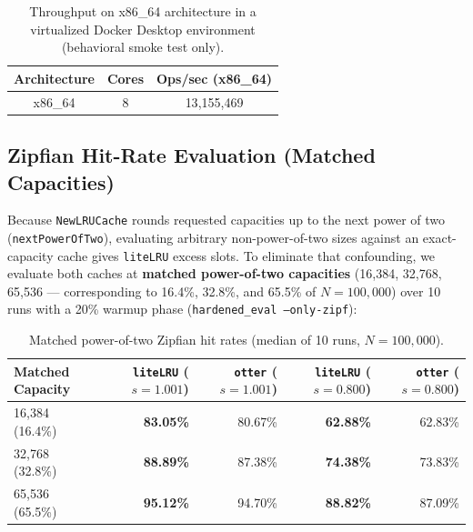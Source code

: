 \documentclass[11pt,a4paper]{article}
\begin{document}
\begin{table}[h]
\centering
\begin{tabular}{@{}ccc@{}}
\toprule
\textbf{Architecture} & \textbf{Cores} & \textbf{Ops/sec (x86\_64)} \\ \midrule
x86\_64               & 8              & 13{,}155{,}469                  \\ \bottomrule
\end{tabular}
\caption{Throughput on x86\_64 architecture in a virtualized Docker Desktop environment (behavioral smoke test only).}
\end{table}

\subsection{Zipfian Hit-Rate Evaluation (Matched Capacities)}

Because \texttt{NewLRUCache} rounds requested capacities up to the next power of two (\texttt{nextPowerOfTwo}), evaluating arbitrary non-power-of-two sizes against an exact-capacity cache gives \texttt{liteLRU} excess slots. To eliminate that confounding, we evaluate both caches at \textbf{matched power-of-two capacities} (16,384, 32,768, 65,536 --- corresponding to 16.4\%, 32.8\%, and 65.5\% of $N=100{,}000$) over 10 runs with a 20\% warmup phase (\texttt{hardened\_eval --only-zipf}):

\begin{table}[h]
\centering
\begin{tabular}{@{}lrrrr@{}}
\toprule
\textbf{Matched Capacity} & \textbf{\texttt{liteLRU} ($s=1.001$)} & \textbf{\texttt{otter} ($s=1.001$)} & \textbf{\texttt{liteLRU} ($s=0.800$)} & \textbf{\texttt{otter} ($s=0.800$)} \\ \midrule
16,384 (16.4\%)           & \textbf{83.05\%}                     & 80.67\%                            & \textbf{62.88\%}                     & 62.83\%                            \\
32,768 (32.8\%)           & \textbf{88.89\%}                     & 87.38\%                            & \textbf{74.38\%}                     & 73.83\%                            \\
65,536 (65.5\%)           & \textbf{95.12\%}                     & 94.70\%                            & \textbf{88.82\%}                     & 87.09\%                            \\ \bottomrule
\end{tabular}
\caption{Matched power-of-two Zipfian hit rates (median of 10 runs, $N=100{,}000$).}
\end{table}
\end{document}
